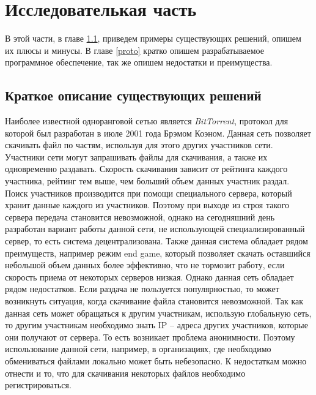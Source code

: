 \section{Исследователькая часть}
В этой части, в главе \ref{exists}, приведем примеры существующих решений,
опишем их плюсы и минусы. В главе \ref{proto} кратко опишем разрабатываемое
программное обеспечение, так же опишем недостатки и преимущества.

\subsection{Краткое описание существующих решений}\label{exists}
Наиболее известной одноранговой сетью является \textit{BitTorrent}\cite{bit_torrent},
протокол для которой был разработан в июле 2001 года Брэмом Коэном.
\newpar
Данная сеть позволяет скачивать файл по частям, используя
для этого других участников сети. Участники сети могут запрашивать файлы
для скачивания, а также их одновременно раздавать. Скорость скачивания
зависит от рейтинга каждого участника, рейтинг тем выше, чем больший
объем данных участник раздал. Поиск участников производится при помощи
специального сервера, который хранит данные каждого из участников.
\newpar
Поэтому при выходе из строя такого сервера передача становится
невозможной, однако на сегодняшний день разработан вариант работы
данной сети, не использующей специализированный сервер, то есть система
децентрализована. Также данная система обладает рядом преимуществ,
например режим end game, который позволяет скачать оставшийся
небольшой объем данных более эффективно, что не тормозит работу, если
скорость приема от некоторых серверов низкая.
\newpar
Однако данная сеть обладает рядом недостатков. Если раздача не пользуется
популярностью, то может возникнуть ситуация, когда скачивание файла
становится невозможной. Так как данная сеть может обращаться к другим
участникам, использую глобальную сеть, то другим участникам необходимо
знать IP – адреса других участников, которые они получают от сервера. То
есть возникает проблема анонимности. Поэтому использование данной сети,
например, в организациях, где необходимо обмениваться файлами локально
может быть небезопасно. К недостаткам можно отнести и то, что для
скачивания некоторых файлов необходимо регистрироваться.

